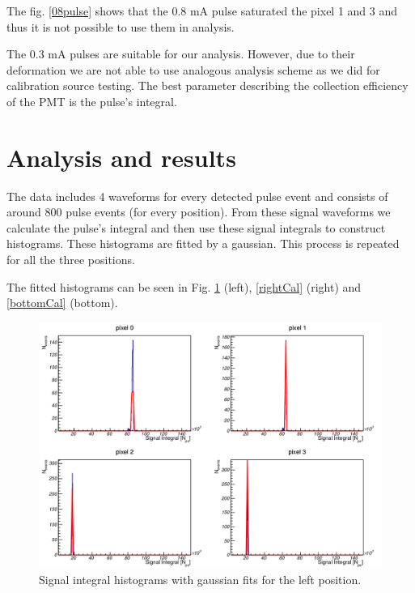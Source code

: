 The fig. \ref{08pulse} shows that the 0.8 mA pulse saturated the pixel 1 and 3 and thus it is not possible to use them in analysis. 


\par
The 0.3 mA pulses are suitable for our analysis. However, due to their deformation we are not able to use analogous analysis scheme as we did for calibration source testing. The best parameter describing the collection efficiency of the PMT is the pulse's integral. 


\section{Analysis and results}
The data includes 4 waveforms for every detected pulse event and consists of around 800 pulse events (for every position). From these signal waveforms we calculate the pulse's integral and then use these signal integrals to construct histograms. These histograms are fitted by a gaussian. This process is repeated for all the three positions.
\par
The fitted histograms can be seen in Fig. \ref{leftCal} (left), \ref{rightCal} (right) and \ref{bottomCal} (bottom).
\begin{figure}[H]
 \centering
 \includegraphics[scale=0.3, angle = 0]{./pictures/left.png}
 \caption{Signal integral histograms with gaussian fits for the left position.}
 \label{leftCal}
 
\end{figure}
